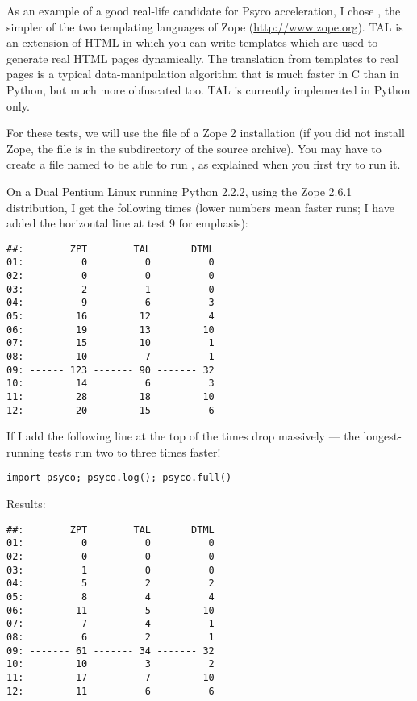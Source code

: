 \documentclass{manual}
\begin{document}
As an example of a good real-life candidate for Psyco acceleration, I chose , the simpler of the two templating languages of Zope (\url{http://www.zope.org}).  TAL is an extension of HTML in which you can write templates which are used to generate real HTML pages dynamically.  The translation from templates to real pages is a typical data-manipulation algorithm that is much faster in C than in Python, but much more obfuscated too.  TAL is currently implemented in Python only.

For these tests, we will use the file  of a Zope 2 installation (if you did not install Zope, the file is in the  subdirectory of the source archive).  You may have to create a file named  to be able to run , as explained when you first try to run it.

On a Dual Pentium Linux running Python 2.2.2, using the Zope 2.6.1 distribution, I get the following times (lower numbers mean faster runs; I have added the horizontal line at test 9 for emphasis):

\begin{verbatim}
##:        ZPT        TAL       DTML
01:          0          0          0
02:          0          0          0
03:          2          1          0
04:          9          6          3
05:         16         12          4
06:         19         13         10
07:         15         10          1
08:         10          7          1
09: ------ 123 ------- 90 ------- 32
10:         14          6          3
11:         28         18         10
12:         20         15          6
\end{verbatim}

If I add the following line at the top of  the times drop massively --- the longest-running tests run two to three times faster!

\begin{verbatim}
import psyco; psyco.log(); psyco.full()
\end{verbatim}

Results:

\begin{verbatim}
##:        ZPT        TAL       DTML
01:          0          0          0
02:          0          0          0
03:          1          0          0
04:          5          2          2
05:          8          4          4
06:         11          5         10
07:          7          4          1
08:          6          2          1
09: ------- 61 ------- 34 ------- 32
10:         10          3          2
11:         17          7         10
12:         11          6          6
\end{verbatim}
\end{document}
